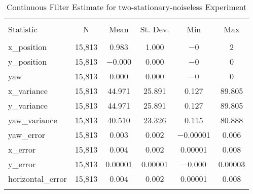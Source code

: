 
\begin{table}[h] \centering 
  \caption{Continuous Filter Estimate for two-stationary-noiseless Experiment} 
  \label{tab:two_stationary_noiseless_continuous_summary} 
\begin{tabular}{@{\extracolsep{5pt}}lccccc} 
\\[-1.8ex]\hline 
\hline \\[-1.8ex] 
Statistic & \multicolumn{1}{c}{N} & \multicolumn{1}{c}{Mean} & \multicolumn{1}{c}{St. Dev.} & \multicolumn{1}{c}{Min} & \multicolumn{1}{c}{Max} \\ 
\hline \\[-1.8ex] 
x\_position & 15,813 & \num{0.983} & \num{1.000} & $-$0 & 2 \\ 
y\_position & 15,813 & $-$0.000 & \num{0.000} & $-$0 & 0 \\ 
yaw & 15,813 & \num{0.000} & \num{0.000} & $-$0 & 0 \\ 
x\_variance & 15,813 & \num{44.971} & \num{25.891} & \num{0.127} & \num{89.805} \\ 
y\_variance & 15,813 & \num{44.971} & \num{25.891} & \num{0.127} & \num{89.805} \\ 
yaw\_variance & 15,813 & \num{40.510} & \num{23.326} & \num{0.115} & \num{80.888} \\ 
yaw\_error & 15,813 & \num{0.003} & \num{0.002} & $-$0.00001 & \num{0.006} \\ 
x\_error & 15,813 & \num{0.004} & \num{0.002} & \num{0.00001} & \num{0.008} \\ 
y\_error & 15,813 & \num{0.00001} & \num{0.00001} & $-$0.000 & \num{0.00003} \\ 
horizontal\_error & 15,813 & \num{0.004} & \num{0.002} & \num{0.00001} & \num{0.008} \\ 
\hline \\[-1.8ex] 
\end{tabular} 
\end{table} 
